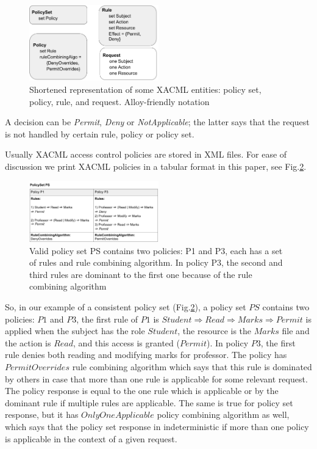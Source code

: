 \documentclass{acm_proc_article-sp}
\begin{document}
\begin{figure}[h]
\includegraphics[width=0.5\textwidth]{model.png}
\caption{Shortened representation of some XACML entities: policy set, policy, rule, and request. Alloy-friendly notation}    
  \label{fig:model}
\end{figure}

A decision can be \textit{Permit}, \textit{Deny} or \textit{NotApplicable}; the latter says that the request is not handled by certain rule, policy or policy set. 

Usually XACML access control policies are stored in XML files. For ease of discussion we print XACML policies in a tabular format in this paper, see Fig.\ref{fig:policyset}.

\begin{figure}[h]
\includegraphics[width=0.5\textwidth]{policyset.png}
\caption{Valid policy set PS contains two policies: P1 and P3, each has a set of rules and rule combining algorithm. In policy P3, the second and third rules are dominant to the first one because of the rule combining algorithm}    
  \label{fig:policyset}
\end{figure}

So, in our example of a consistent policy set (Fig.\ref{fig:policyset}), a policy set $PS$ contains two policies: $P1$ and $P3$, the first rule of $P1$ is $Student \Rightarrow Read \Rightarrow Marks \Rightarrow Permit $ is applied when the subject has the role $Student$, the resource is the $Marks$ file and the action is $Read$, and this access is granted ($Permit$). In policy $P3$, the first rule denies both reading and modifying marks for professor. The policy has $PermitOverrides$ rule combining algorithm which says that this rule is dominated by others in case that more than one rule is applicable for some relevant request. The policy response is equal to the one rule which is applicable or by the dominant rule if multiple rules are applicable. The same is true for policy set response, but it has $OnlyOneApplicable$ policy combining algorithm as well, which says that the policy set response in indeterministic if more than one policy is applicable in the context of a given request.
\end{document}
